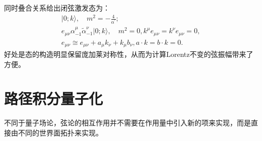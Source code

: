 同时叠合关系给出闭弦激发态为：
\begin{equation}
	\begin{gathered}
		|0;k\rangle,\quad m^2=-\frac{4}{\alpha^{\prime}};\\e_{\mu\nu}\alpha_{-1}^\mu\tilde{\alpha}_{-1}^\nu|0;k\rangle,\quad m^2=0,k^\mu e_{\mu\nu}=k^\nu e_{\mu\nu}=0,\\e_{\mu\nu}\cong e_{\mu\nu}+a_\mu k_\nu+k_\mu b_\nu,a\cdot k=b\cdot k=0.
	\end{gathered}
\end{equation}
好处是态的构造明显保留庞加莱对称性，从而为计算Lorentz不变的弦振幅带来了方便。
\section{路径积分量子化}
不同于量子场论，弦论的相互作用并不需要在作用量中引入新的项来实现，而是直接由不同的世界面拓扑来实现。
